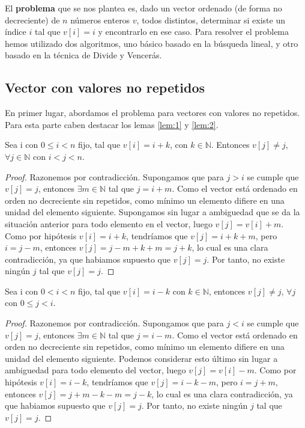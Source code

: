 El \textbf{problema} que se nos plantea es, dado un vector ordenado (de forma no decreciente) de $n$ números enteros $v$, todos 
distintos, determinar si existe un índice $i$ tal que $v[i] = i$ y 
encontrarlo en ese caso. Para resolver el problema hemos utilizado dos algoritmos, uno básico basado en 
la búsqueda lineal, y otro basado en la técnica de Divide y Vencerás. 

\subsection{Vector con valores no repetidos}

En primer lugar, abordamos el problema para vectores con valores no repetidos. Para esta parte
caben destacar los lemas \ref{lem:1} y \ref{lem:2}. 


\begin{lemma}
    \label{lem:1}
    Sea i con $0 \leqslant i < n$ fijo, tal que $v[i]=i+k$, con $k \in \mathbb N$. 
    Entonces $v[j] \neq j$, $\forall j \in \mathbb N$ con $i < j < n$. 
\end{lemma}

\begin{proof}
    Razonemos por contradicción. Supongamos que para $j > i$ se 
    cumple que $v[j]=j$, entonces $\exists m \in \mathbb N$ tal que $j=i+m$. Como el 
    vector está ordenado en orden no decreciente sin repetidos, como mínimo un elemento
    difiere en una unidad del elemento siguiente. Supongamos sin lugar a ambiguedad que
    se da la situación anterior para todo elemento en el vector, luego $v[j]=v[i]+m$. Como por hipótesis
    $v[i]=i+k$, tendríamos que $v[j]=i+k+m$, pero $i=j-m$, entonces $v[j]=j-m+k+m=j+k$, lo
    cual es una clara contradicción, ya que habiamos supuesto que $v[j]=j$. Por tanto, no 
    existe ningún $j$ tal que $v[j]=j$.
\end{proof}

\begin{lemma}
    \label{lem:2}
    Sea i con $0 < i < n$ fijo, tal que $v[i]=i-k$ con 
    $k \in \mathbb N$, entonces $v[j] \neq j$,  $\forall j$ con $0 \leqslant j < i$. 
\end{lemma}

\begin{proof}
    Razonemos por contradicción. Supongamos que para $j < i$ se 
    cumple que $v[j]=j$, entonces $\exists m \in \mathbb N$ tal que $j=i-m$. Como el 
    vector está ordenado en orden no decreciente sin repetidos, como mínimo un elemento
    difiere en una unidad del elemento siguiente. Podemos considerar esto último sin 
    lugar a ambiguedad para todo elemento del vector, luego $v[j]=v[i]-m$. Como por hipótesis
    $v[i]=i-k$, tendríamos que $v[j]=i-k-m$, pero $i=j+m$, entonces $v[j]=j+m-k-m=j-k$, lo
    cual es una clara contradicción, ya que habiamos supuesto que $v[j]=j$. Por tanto, no 
    existe ningún $j$ tal que $v[j]=j$.
\end{proof}

